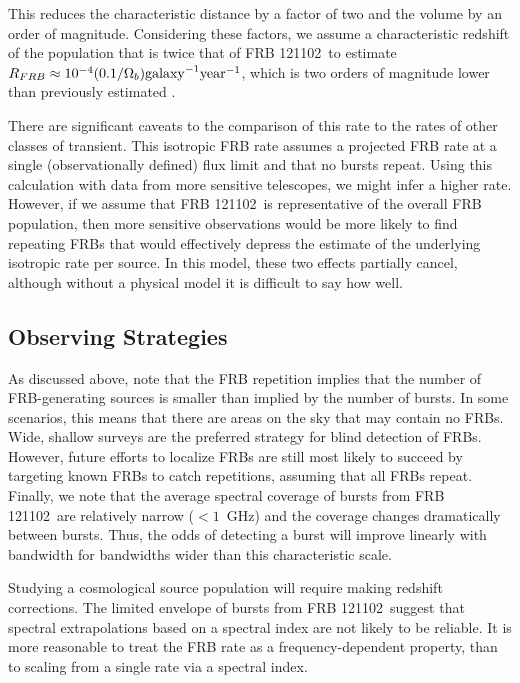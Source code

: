 \documentclass[twocolumn]{aastex61}
\newcommand{\frb}{FRB 121102}
\begin{document}
This reduces the characteristic distance by a factor of two and the volume by an order of magnitude. Considering these factors, we assume a characteristic redshift of the population that is twice that of \frb\ to estimate $R_{FRB} \approx 10^{-4} (0.1/\Omega_b) \rm{galaxy}^{-1} \rm{year}^{-1}$, which is two orders of magnitude lower than previously estimated \citep[assuming isotropic radiation;]{2013Sci...341...53T}.

There are significant caveats to the comparison of this rate to the rates of other classes of transient. This isotropic FRB rate assumes a projected FRB rate at a single (observationally defined) flux limit and that no bursts repeat. Using this calculation with data from more sensitive telescopes, we might infer a higher rate. However, if we assume that \frb\ is representative of the overall FRB population, then more sensitive observations would be more likely to find repeating FRBs that would effectively depress the estimate of the underlying isotropic rate per source. In this model, these two effects partially cancel, although without a physical model it is difficult to say how well.

\subsection{Observing Strategies}
As discussed above, \citet{2016MNRAS.458L..89C} note that the FRB repetition implies that the number of FRB-generating sources is smaller than implied by the number of bursts. In some scenarios, this means that there are areas on the sky that may contain no FRBs. Wide, shallow surveys are the preferred strategy for blind detection of FRBs. However, future efforts to localize FRBs are still most likely to succeed by targeting known FRBs to catch repetitions, assuming that all FRBs repeat. Finally, we note that the average spectral coverage of bursts from \frb\ are relatively narrow ($<1$~GHz) and the coverage changes dramatically between bursts. Thus, the odds of detecting a burst will improve linearly with bandwidth for bandwidths wider than this characteristic scale.

Studying a cosmological source population will require making redshift corrections. The limited envelope of bursts from \frb\ suggest that spectral extrapolations based on a spectral index are not likely to be reliable. It is more reasonable to treat the FRB rate as a frequency-dependent property, than to scaling from a single rate via a spectral index.
\end{document}
